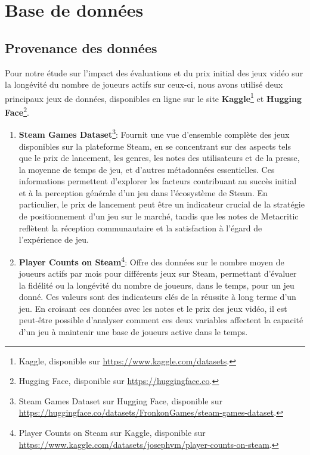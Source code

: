 \documentclass[mstat,12pt]{unswthesis}
\begin{document}
\hypertarget{base-de-donnuxe9es}{%
\chapter{Base de données}\label{base-de-donnuxe9es}}

\hypertarget{provenance-des-donnuxe9es}{%
\section{Provenance des données}\label{provenance-des-donnuxe9es}}

Pour notre étude sur l'impact des évaluations et du prix initial des
jeux vidéo sur la longévité du nombre de joueurs actifs sur ceux-ci,
nous avons utilisé deux principaux jeux de données, disponibles en ligne
sur le site \textbf{Kaggle}\footnote{Kaggle, disponible sur
  \url{https://www.kaggle.com/datasets}.} et \textbf{Hugging
Face}\footnote{Hugging Face, disponible sur
  \url{https://huggingface.co}.}.

\begin{enumerate}
\def\labelenumi{\arabic{enumi}.}
\item
  \textbf{Steam Games Dataset}\footnote{Steam Games Dataset sur Hugging
    Face, disponible sur
    \url{https://huggingface.co/datasets/FronkonGames/steam-games-dataset}.}:
  Fournit une vue d'ensemble complète des jeux disponibles sur la
  plateforme Steam, en se concentrant sur des aspects tels que le prix
  de lancement, les genres, les notes des utilisateurs et de la presse,
  la moyenne de temps de jeu, et d'autres métadonnées essentielles. Ces
  informations permettent d'explorer les facteurs contribuant au succès
  initial et à la perception générale d'un jeu dans l'écosystème de
  Steam. En particulier, le prix de lancement peut être un indicateur
  crucial de la stratégie de positionnement d'un jeu sur le marché,
  tandis que les notes de Metacritic reflètent la réception
  communautaire et la satisfaction à l'égard de l'expérience de jeu.
\item
  \textbf{Player Counts on Steam}\footnote{Player Counts on Steam sur
    Kaggle, disponible sur
    \url{https://www.kaggle.com/datasets/josephvm/player-counts-on-steam}.}:
  Offre des données sur le nombre moyen de joueurs actifs par mois pour
  différents jeux sur Steam, permettant d'évaluer la fidélité ou la
  longévité du nombre de joueurs, dans le temps, pour un jeu donné. Ces
  valeurs sont des indicateurs clés de la réussite à long terme d'un
  jeu. En croisant ces données avec les notes et le prix des jeux vidéo,
  il est peut-être possible d'analyser comment ces deux variables
  affectent la capacité d'un jeu à maintenir une base de joueurs active
  dans le temps.
\end{enumerate}
\end{document}
